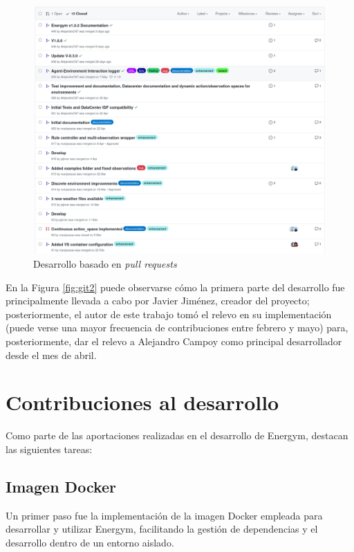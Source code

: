 \begin{figure}
    \centering
    \includegraphics[width=\textwidth]{imagenes/git-pull-requests.png}
    \caption{Desarrollo basado en \textit{pull requests}}
    \label{fig:git3}
\end{figure}

En la Figura \ref{fig:git2} puede observarse cómo la primera parte del desarrollo fue principalmente llevada a cabo por Javier Jiménez, creador del proyecto; posteriormente, el autor de este trabajo tomó el relevo en su implementación (puede verse una mayor frecuencia de contribuciones entre febrero y mayo) para, posteriormente, dar el relevo a Alejandro Campoy como principal desarrollador desde el mes de abril.

\section{Contribuciones al desarrollo}

Como parte de las aportaciones realizadas en el desarrollo de Energym, destacan las siguientes tareas:

\subsection{Imagen Docker}

Un primer paso fue la implementación de la imagen Docker empleada para desarrollar y utilizar Energym, facilitando la gestión de dependencias y el desarrollo dentro de un entorno aislado. 
    

